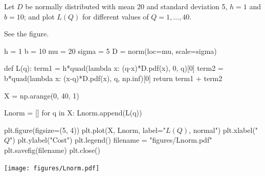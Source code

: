 \begin{exercise}\label{ex:nw_stoc_norm}
Let $D$ be normally distributed with mean 20 and standard deviation 5, $h=1$ and $b=10$; and plot $L(Q)$ for different values of $Q=1,\ldots,40$.


\begin{solution}
See the figure.


\begin{pycode}[news]
h = 1
b = 10
mu = 20
sigma = 5 
D = norm(loc=mu, scale=sigma) 

def L(q):
    term1 = h*quad(lambda x: (q-x)*D.pdf(x), 0, q)[0]
    term2 = b*quad(lambda x: (x-q)*D.pdf(x), q, np.inf)[0]
    return term1 + term2

X = np.arange(0, 40, 1)

Lnorm = []
for q in X:
    Lnorm.append(L(q))

plt.figure(figsize=(5, 4))
plt.plot(X, Lnorm, label="$L(Q)$, normal")
plt.xlabel("$Q$")
plt.ylabel("Cost")
plt.legend()
filename = "figures/Lnorm.pdf"
plt.savefig(filename)
plt.close()
\end{pycode}

\begin{center}
\texttt{[image: figures/Lnorm.pdf]}
\end{center}

\end{solution}
\end{exercise}


